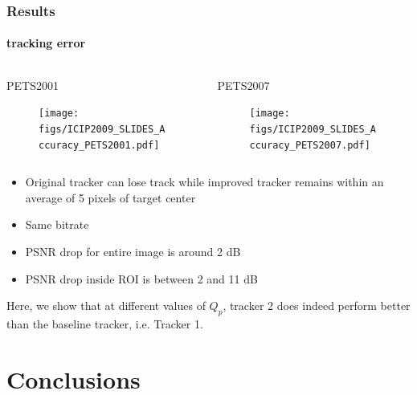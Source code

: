\begin{frame}
\frametitle{Results}
\framesubtitle{tracking error}
\logoCSIPCPL\mypagenum 
{}
{
	\begin{columns}
		\begin{column}{1.8in}
			\begin{center}
				PETS2001
			\end{center}
			\begin{figure}
				\texttt{[image: figs/ICIP2009\_SLIDES\_Accuracy\_PETS2001.pdf]}
			\end{figure}
		\end{column}
		\begin{column}{1.8in}
			\begin{center}
				PETS2007
			\end{center}
			\begin{figure}
				\texttt{[image: figs/ICIP2009\_SLIDES\_Accuracy\_PETS2007.pdf]}	
			\end{figure}
		\end{column}			
	\end{columns}
	\begin{itemize}
		\item Original tracker can lose track while improved tracker remains within an average of 5 pixels of target center
		\item Same bitrate
		\item PSNR drop for entire image is around 2 dB
		\item PSNR drop inside ROI is between 2 and 11 dB
	\end{itemize}
}
{
Here, we show that at different values of $Q_p$, tracker 2 does indeed perform better than the baseline tracker, i.e. Tracker 1.  
}
\end{frame}











\section{Conclusions}

